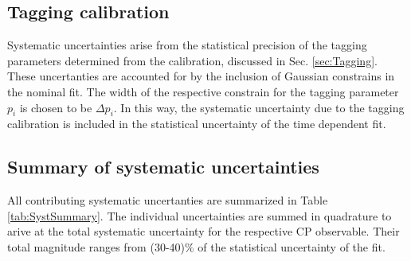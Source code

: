 \subsection{Tagging calibration}

Systematic uncertainties arise from the statistical precision of the tagging parameters determined from the calibration, discussed in Sec. \ref{sec:Tagging}.
These uncertanties are accounted for by the inclusion of Gaussian constrains in the nominal fit. 
The width of the respective constrain for the tagging parameter $p_{i}$  is chosen to be $\Delta p_{i}$. 
In this way, the systematic uncertainty due to the tagging calibration is included in the statistical uncertainty of the time dependent fit.  

\subsection{Summary of systematic uncertainties}

All contributing systematic uncertanties are summarized in Table \ref{tab:SystSummary}. 
The individual uncertainties are summed in quadrature to arive at the total systematic uncertainty for the respective CP observable.
Their total magnitude ranges from (30-40)$\%$ of the statistical uncertainty of the fit.




